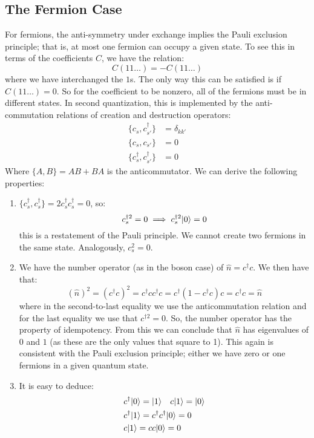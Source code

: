 \subsection{The Fermion Case}
For fermions, the anti-symmetry under exchange implies the Pauli exclusion principle; that is, at most one fermion can occupy a given state. To see this in terms of the coefficients $C$, we have the relation:
\begin{equation}
    C(11\ldots) = -C(11\ldots)
\end{equation}
where we have interchanged the $1$s. The only way this can be satisfied is if $C(11\ldots) = 0$. So for the coefficient to be nonzero, all of the fermions must be in different states. In second quantization, this is implemented by the anti-commutation relations of creation and destruction operators:
\begin{equation}
    \begin{split}
        \{c_s, c_{s'}^\dagger\} &= \delta_{kk'}
        \\ \{c_s, c_{s'}\} &= 0
        \\ \{c_s^\dagger, c_{s'}^\dagger\} &= 0
    \end{split}
\end{equation}
Where $\{A, B\} = AB + BA$ is the anticommutator. We can derive the following properties:
\begin{enumerate}
    \item $\{c_s^\dag, c_s^\dag\} = 2c_s^\dag c_s^\dag = 0$, so:
    \begin{equation}
        c_s^{\dagger 2} = 0 \implies c_s^{\dagger 2}\lvert 0 \rangle = 0
    \end{equation}
    this is a restatement of the Pauli principle. We cannot create two fermions in the same state. Analogously, $c_s^2 = 0$.
    \item We have the number operator (as in the boson case) of $\hat{n} = c^\dag c$. We then have that:
    \begin{equation}
        (\hat{n})^2 = (c^\dag c)^2 = c^\dag c c^\dag c = c^\dag (1 - c^\dag c)c = c^\dag c = \hat{n}
    \end{equation}
    where in the second-to-last equality we use the anticommutation relation and for the last equality we use that $c^{\dag 2} = 0$. So, the number operator has the property of idempotency. From this we can conclude that $\hat{n}$ has eigenvalues of $0$ and $1$ (as these are the only values that square to 1). This again is consistent with the Pauli exclusion principle; either we have zero or one fermions in a given quantum state.
    \item It is easy to deduce:
    \begin{equation}
        \begin{split}
            &c^\dagger\lvert 0 \rangle = \lvert 1 \rangle \quad c\lvert 1 \rangle = \lvert 0 \rangle
            \\ &c^\dagger\lvert 1 \rangle = c^\dagger c^\dagger \lvert 0 \rangle = 0
            \\ &c\lvert 1 \rangle = c c\lvert 0 \rangle = 0
        \end{split}
    \end{equation}
\end{enumerate}

